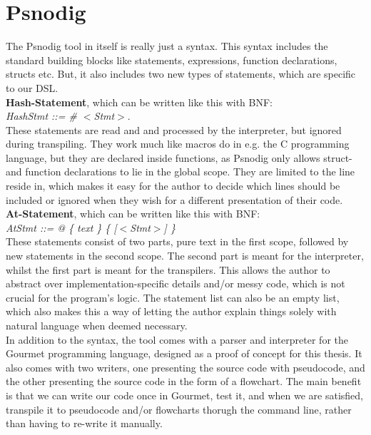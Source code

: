 \section{Psnodig}

The Psnodig tool in itself is really just a syntax. This syntax includes the standard building blocks like statements, expressions, function declarations, structs etc. But, it also includes two new types of statements, which are specific to our DSL. \hfill \\

\textbf{Hash-Statement}, which can be written like this with BNF: \hfill \\

\textit{HashStmt ::= \# $<$Stmt$>$}. \hfill \\

These statements are read and and processed by the interpreter, but ignored during transpiling. They work much like macros do in e.g. the C programming language, but they are declared inside functions, as Psnodig only allows struct- and function declarations to lie in the global scope. They are limited to the line reside in, which makes it easy for the author to decide which lines should be included or ignored when they wish for a different presentation of their code. \hfill \\

\textbf{At-Statement}, which can be written like this with BNF: \hfill \\

\textit{AtStmt ::= @ \{ text \} \{ [$<$Stmt$>$] \}} \hfill \\

These statements consist of two parts, pure text in the first scope, followed by new statements in the second scope. The second part is meant for the interpreter, whilst the first part is meant for the transpilers. This allows the author to abstract over implementation-specific details and/or messy code, which is not crucial for the program's logic. The statement list can also be an empty list, which also makes this a way of letting the author explain things solely with natural language when deemed necessary. \hfill \\

In addition to the syntax, the tool comes with a parser and interpreter for the Gourmet programming language, designed as a proof of concept for this thesis. It also comes with two writers, one presenting the source code with pseudocode, and the other presenting the source code in the form of a flowchart. The main benefit is that we can write our code once in Gourmet, test it, and when we are satisfied, transpile it to pseudocode and/or flowcharts thorugh the command line, rather than having to re-write it manually. \hfill \\

